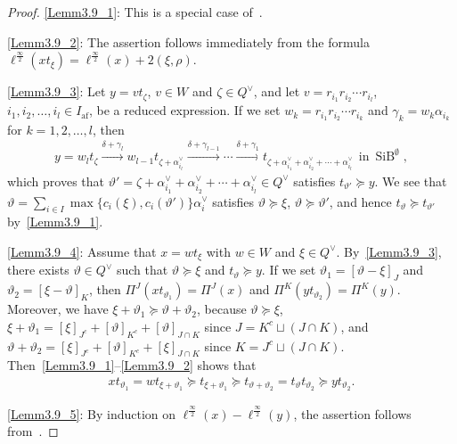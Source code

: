 \documentclass[ALCO,ThmDefs,Unicode,epreuves]{cedram}
\newcommand{\si}{\frac{\infty}{2}}
\DeclareMathOperator{\af}{af}
\DeclareMathOperator{\SiB}{SiB}
\begin{document}
\begin{proof}
\ref{Lemm3.9_1}: 
This is a special case of~\cite[Lemma~6.2.1]{INS16}.

\ref{Lemm3.9_2}: 
The assertion follows immediately from the formula 
$\ell^{\si}(x t_{\xi}) = \ell^{\si}(x) + 2(\xi,\rho)$. 

\ref{Lemm3.9_3}: 
Let 
$y = v t_{\zeta}$, 
$v \in W$ 
and 
$\zeta \in Q^{\vee}$, 
and let
$v = r_{i_1} r_{i_2} \cdots r_{i_l}$, 
$i_1 , i_2 , \ldots , i_l \in I_{\af}$, 
be a reduced expression. 
If we set 
$w_k = r_{i_1} r_{i_2} \cdots r_{i_k}$
and 
$\gamma_k = w_k \alpha_{i_k}$
for 
$k = 1,2,\ldots ,l$, then
\begin{align}
y = w_l t_{\zeta} 
\xrightarrow{\delta + \gamma_l} 
w_{l-1} t_{\zeta + \alpha_{i_l}^{\vee}} 
\xrightarrow{\delta + \gamma_{l-1}}
\cdots 
\xrightarrow{\delta + \gamma_1}
t_{\zeta + \alpha_{i_1}^{\vee} + \alpha_{i_2}^{\vee} + \cdots + \alpha_{i_l}^{\vee}}
\ \ 
\text{in}
\ 
\SiB ^{\emptyset}, 
\end{align}
which proves that 
$\vartheta' = \zeta + \alpha_{i_1}^{\vee} + \alpha_{i_2}^{\vee} + \cdots + \alpha_{i_l}^{\vee} \in Q^{\vee}$ 
satisfies 
$t_{\vartheta'} \succeq y$. 
We see that 
$\vartheta = \sum_{i \in I} \max \{ c_i(\xi) , c_i(\vartheta') \} \alpha_i^{\vee}$ 
satisfies 
$\vartheta \succeq \xi$, 
$\vartheta \succeq \vartheta'$, 
and hence 
$t_{\vartheta} \succeq t_{\vartheta'}$
by~\ref{Lemm3.9_1}.

\ref{Lemm3.9_4}: 
Assume that 
$x = wt_{\xi}$
with 
$w \in W$
and 
$\xi \in Q^{\vee}$. 
By~\ref{Lemm3.9_3}, 
there exists 
$\vartheta \in Q^{\vee}$ 
such that 
$\vartheta \succeq \xi$
and 
$t_{\vartheta} \succeq y$. 
If we set 
$\vartheta_1 = [\vartheta - \xi]_J$
and 
$\vartheta_2 =[\xi - \vartheta]_K$, 
then
$\Pi^J(x t_{\vartheta_1}) = \Pi^J(x)$
and 
$\Pi^K(y t_{\vartheta_2}) = \Pi^K(y)$. 
Moreover, we have 
$\xi + \vartheta_1 \succeq \vartheta + \vartheta_2$, 
because 
$\vartheta \succeq \xi$, 
$\xi + \vartheta_1 = [\xi]_{J^c} + [\vartheta]_{K^c} + [\vartheta]_{J \cap K}$
since 
$J = K^c \sqcup (J \cap K)$, and 
$\vartheta + \vartheta_2 = [\xi]_{J^c} + [\vartheta]_{K^c} + [\xi]_{J \cap K}$
since
$K = J^c \sqcup (J \cap K)$. 
Then~\ref{Lemm3.9_1}--\ref{Lemm3.9_2} shows that
\begin{align}
xt_{\vartheta_1} 
=
wt_{\xi + \vartheta_1}
\succeq
t_{\xi + \vartheta_1}
\succeq
t_{\vartheta + \vartheta_2}
=
t_{\vartheta} t_{\vartheta_2}
\succeq
yt_{\vartheta_2}.
\end{align}

\ref{Lemm3.9_5}: 
By induction on $\ell^{\si}(x) - \ell^{\si}(y)$, 
the assertion follows from~\cite[Lemma~6.1.1 for $K = \emptyset$]{INS16}.
\end{proof}
\end{document}

